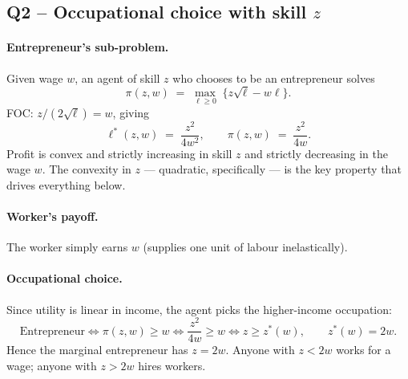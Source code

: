 \documentclass[11pt,a4paper]{article}
\begin{document}
\subsection*{Q2 -- Occupational choice with skill $z$}

\paragraph{Entrepreneur's sub-problem.}
Given wage $w$, an agent of skill $z$ who chooses to be an entrepreneur solves
\[
\pi(z,w)\;=\;\max_{\ell\ge 0}\;\bigl\{z\sqrt{\ell}-w\ell\bigr\}.
\]
FOC: $z/(2\sqrt{\ell})=w$, giving
\begin{equation}
\ell^{*}(z,w)\;=\;\frac{z^{2}}{4w^{2}},\qquad
\pi(z,w)\;=\;\frac{z^{2}}{4w}.
\label{eq:q2_profit}
\end{equation}
Profit is convex and strictly increasing in skill $z$ and strictly decreasing in the wage $w$. The convexity in $z$ --- quadratic, specifically --- is the key property that drives everything below.

\paragraph{Worker's payoff.}
The worker simply earns $w$ (supplies one unit of labour inelastically).

\paragraph{Occupational choice.}
Since utility is linear in income, the agent picks the higher-income occupation:
\begin{equation}
\text{Entrepreneur}\iff \pi(z,w)\ge w
\iff \frac{z^{2}}{4w}\ge w
\iff z\ge z^{*}(w),
\qquad\boxed{z^{*}(w)=2w.}
\label{eq:q2_threshold}
\end{equation}
Hence the marginal entrepreneur has $z=2w$. Anyone with $z<2w$ works for a wage; anyone with $z>2w$ hires workers.
\end{document}
